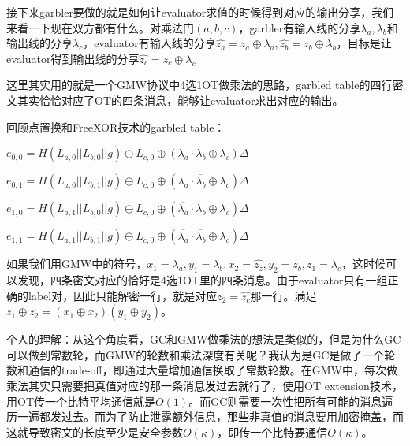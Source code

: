 \documentclass[UTF8]{ctexart}
\theoremstyle{nonumberplain}
\theoremstyle{plain}
\begin{document}
接下来garbler要做的就是如何让evaluator求值的时候得到对应的输出分享，我们来看一下现在双方都有什么。对乘法门$(a,b,c)$，garbler有输入线的分享$\lambda_a,\lambda_b$和输出线的分享$\lambda_c$，evaluator有输入线的分享$\hat{z_a}=z_a\oplus \lambda_a,\hat{z_b}=z_b\oplus \lambda_b$，目标是让evaluator得到输出线的分享$\hat{z_c}=z_c\oplus \lambda_c$

这里其实用的就是一个GMW协议中4选1OT做乘法的思路，garbled table的四行密文其实恰恰对应了OT的四条消息，能够让evaluator求出对应的输出。

回顾点置换和FreeXOR技术的garbled table：

	$e_{0,0} = H(L_{a,0}||L_{b,0}||g)\oplus L_{c,0}\oplus (\lambda_a\cdot\lambda_b\oplus \lambda_c)\Delta$

    $e_{0,1} =H(L_{a,0}||L_{b,1}||g)\oplus L_{c,0}\oplus (\lambda_a\cdot\overline{\lambda_b}\oplus \lambda_c)\Delta$

    $e_{1,0} = H(L_{a,1}||L_{b,0}||g)\oplus L_{c,0}\oplus (\overline{\lambda_a}\cdot\lambda_b\oplus \lambda_c)\Delta$

    $e_{1,1} = H(L_{a,1}||L_{b,1}||g)\oplus L_{c,0}\oplus (\overline{\lambda_a}\cdot\overline{\lambda_b}\oplus \lambda_c)\Delta$

如果我们用GMW中的符号，$x_1=\lambda_a,y_1=\lambda_b,x_2=\hat{z_z},y_2=\hat{z_b},z_1=\lambda_c$，这时候可以发现，四条密文对应的恰好是4选1OT里的四条消息。由于evaluator只有一组正确的label对，因此只能解密一行，就是对应$z_2=\hat{z_c}$那一行。满足$z_1\oplus z_2=(x_1\oplus x_2)(y_1\oplus y_2)$。

个人的理解：从这个角度看，GC和GMW做乘法的想法是类似的，但是为什么GC可以做到常数轮，而GMW的轮数和乘法深度有关呢？我认为是GC是做了一个轮数和通信的trade-off，即通过大量增加通信换取了常数轮数。在GMW中，每次做乘法其实只需要把真值对应的那一条消息发过去就行了，使用OT extension技术，用OT传一个比特平均通信就是$O(1)$。而GC则需要一次性把所有可能的消息遍历一遍都发过去。而为了防止泄露额外信息，那些非真值的消息要用加密掩盖，而这就导致密文的长度至少是安全参数$O(\kappa)$，即传一个比特要通信$O(\kappa)$。
	
	
	
	
	
	
	
\end{document}
